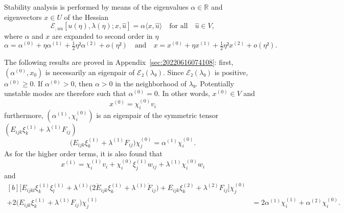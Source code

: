\documentclass[12pt, final]{scrartcl}
\theoremstyle{definition}
\newcommand{\E}{\mathcal E}
\newcommand{\order}[2][1]{#2^{(#1)}}
\newcommand{\reals}{\mathbb{R}}
\begin{document}
Stability analysis is performed by means of the eigenvalues $α \in \reals$ and
eigenvectors $x \in U$ of the Hessian
\begin{equation}
  \label{eq:20220617074949}
  \E_{, u u} [u(η), \lambda(η); x, \hat{u}] = α 〈 x, \hat{u} 〉 \quad \text{for all} \quad \hat{u} \in V,
\end{equation}
where $α$ and $x$ are expanded to second order in $η$
\begin{equation}
  \label{eq:20220617064633}
  α = \order[0]α + η \order[1]α + \tfrac{1}{2} η² \order[2]α + o(η²)
  \quad \text{and} \quad
  x = \order[0]x + η \order[1]x + \tfrac{1}{2} η² \order[2]x + o(η²).
\end{equation}

The following results are proved in Appendix~\ref{sec:20220616074108}: first,
$(\order[0]α, x_0)$ is necessarily an eigenpair of $\E₂(\lambda₀)$. Since $\E₂ (\lambda₀)$ is
positive, $\order[0]α ≥ 0$. If $\order[0]α>0$, then $α>0$ in the neighborhood of
$\lambda₀$. Potentially unstable modes are therefore such that $\order[0]α=0$. In other
words, $\order[0]x \in V$ and
\begin{equation}
  \label{eq:20220904160057}
  \order[0]x = \order[0]{χ_i} v_i
\end{equation}
furthermore, $(\order[1]α, \order[0]{χ_i})$ is an eigenpair of the symmetric
tensor $(E_{ijk} \order[1]{ξ_k} + \order[1]\lambda F_{ij})$
\begin{equation}
  \label{eq:20220609133608}
  \bigl(E_{ijk} \order[1]{ξ_k} + \order[1]\lambda F_{ij} \bigr) \order[0]{χ_j} = \order[1]α \order[0]{χ_i}.
\end{equation}
As for the higher order terms, it is also found that
\begin{equation}
  \label{eq:20220609133629}
  \order[1]x = \order[1]{χ_i} v_i +  \order[0]{χ_i} \order[1]{ξ_j} w_{i j} + \order[1]\lambda \order[0]{χ_i} w_i
\end{equation}
and
\begin{equation}
  \label{eq:20220616082923}
  \begin{aligned}[b]
    \bigl[E_{ijkl} \order[1]{ξ_k} \order[1]{ξ_l} + \order[1]\lambda\bigl(2 \mathring{E}_{ijk} \order[1]{ξ_k} + \order[1]\lambda \mathring{F}_{ij}\bigr) + E_{ijk} \order[2]{ξ_k}
    + \order[2]\lambda F_{ij} \bigr] \order[0]{χ_j} &\\
    + 2\bigl(E_{ijk}  \order[1]{ξ_k} + \order[1]\lambda F_{ij} \bigr) \order[1]{χ_j}
    & = 2\order[1]α\order[1]{χ_i} + \order[2]α \order[0]{χ_i}.
  \end{aligned}
\end{equation}
\end{document}
